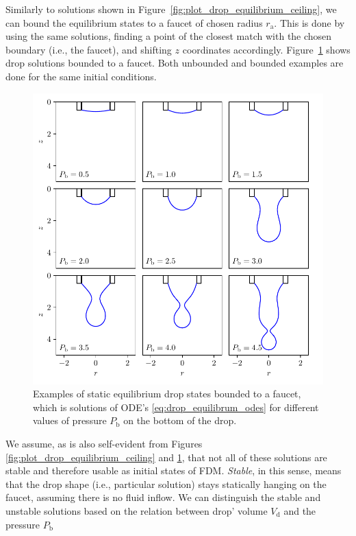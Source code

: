     Similarly to solutions shown in Figure~\ref{fig:plot_drop_equilibrium_ceiling}, we can bound the equilibrium states to a faucet of chosen radius $r_{\mathrm{a}}$. This is done by using the same solutions, finding a point of the closest match with the chosen boundary (i.e., the faucet), and shifting $z$ coordinates accordingly. Figure~\ref{fig:plot_drop_equilibrium_faucet} shows drop solutions bounded to a faucet. Both unbounded and bounded examples are done for the same initial conditions. 

    \begin{figure}[H]
    \begin{center}
        \includegraphics[width=1.0\columnwidth]{img/plot_drop_equilibrium_faucet.pdf}
    \end{center}
        \caption{Examples of static equilibrium drop states bounded to a faucet, which is solutions of ODE's \eqref{eq:drop_equilibrum_odes} for different values of pressure $P_{\mathrm{b}}$ on the bottom of the drop.}
    \label{fig:plot_drop_equilibrium_faucet}
    \end{figure}

    We assume, as is also self-evident from Figures \ref{fig:plot_drop_equilibrium_ceiling} and \ref{fig:plot_drop_equilibrium_faucet}, that not all of these solutions are stable and therefore usable as initial states of FDM. \emph{Stable}, in this sense, means that the drop shape (i.e., particular solution) stays statically hanging on the faucet, assuming there is no fluid inflow. We can distinguish the stable and unstable solutions based on the relation between drop' volume $V_{\mathrm{d}}$ and the pressure $P_{\mathrm{b}}$ 

